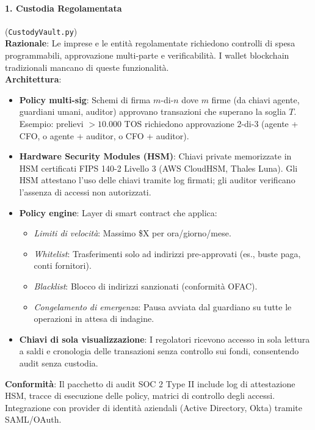 \documentclass[11pt]{article}
\begin{document}
\paragraph{1. Custodia Regolamentata} (\texttt{CustodyVault.py})\\
\textbf{Razionale}: Le imprese e le entità regolamentate richiedono controlli di spesa programmabili, approvazione multi-parte e verificabilità. I wallet blockchain tradizionali mancano di queste funzionalità.\\
\textbf{Architettura}:
\begin{itemize}[noitemsep]
  \item \textbf{Policy multi-sig}: Schemi di firma $m$-di-$n$ dove $m$ firme (da chiavi agente, guardiani umani, auditor) approvano transazioni che superano la soglia $T$. Esempio: prelievi $>10.000$ TOS richiedono approvazione 2-di-3 (agente + CFO, o agente + auditor, o CFO + auditor).
  \item \textbf{Hardware Security Modules (HSM)}: Chiavi private memorizzate in HSM certificati FIPS 140-2 Livello 3 (AWS CloudHSM, Thales Luna). Gli HSM attestano l'uso delle chiavi tramite log firmati; gli auditor verificano l'assenza di accessi non autorizzati.
  \item \textbf{Policy engine}: Layer di smart contract che applica:
    \begin{itemize}[noitemsep]
      \item \emph{Limiti di velocità}: Massimo \$X per ora/giorno/mese.
      \item \emph{Whitelist}: Trasferimenti solo ad indirizzi pre-approvati (es., buste paga, conti fornitori).
      \item \emph{Blacklist}: Blocco di indirizzi sanzionati (conformità OFAC).
      \item \emph{Congelamento di emergenza}: Pausa avviata dal guardiano su tutte le operazioni in attesa di indagine.
    \end{itemize}
  \item \textbf{Chiavi di sola visualizzazione}: I regolatori ricevono accesso in sola lettura a saldi e cronologia delle transazioni senza controllo sui fondi, consentendo audit senza custodia.
\end{itemize}
\textbf{Conformità}: Il pacchetto di audit SOC 2 Type II include log di attestazione HSM, tracce di esecuzione delle policy, matrici di controllo degli accessi. Integrazione con provider di identità aziendali (Active Directory, Okta) tramite SAML/OAuth.
\end{document}
